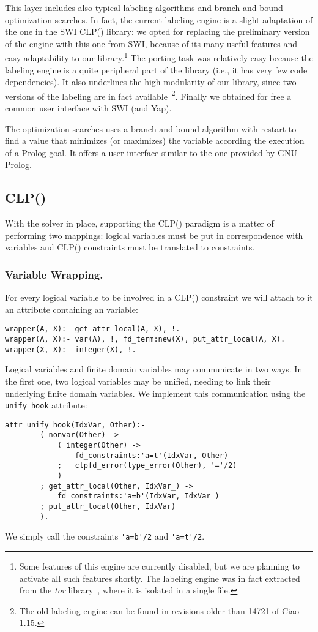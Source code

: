 \documentclass{llncs}
\newcommand{\clpfd}{CLP()\xspace}
\newcommand{\fd}{\xspace}
\begin{document}
This layer includes also typical labeling algorithms and branch and
bound optimization searches. In fact, the current labeling engine is a slight adaptation of the one
in the SWI \clpfd library: we opted for replacing the preliminary
version of the engine with this one from SWI, because of its many
useful features and easy adaptability to our library.\footnote{Some
  features of this engine are currently disabled, but we are planning
  to activate all such features shortly. The labeling engine was in
  fact extracted from the \emph{tor} library~\cite{tor2012}, where it
  is isolated in a single file.}
The porting task was relatively easy because the labeling engine is a
quite peripheral part of the library (i.e., it has very few code
dependencies).  It also underlines the high modularity of our library,
since two versions of the labeling are in fact available~\footnote{The
  old labeling engine can be found in revisions older than 14721 of
  Ciao 1.15.}.  Finally we obtained for free a common user interface
with SWI (and Yap).

The optimization searches uses a branch-and-bound algorithm with
restart to find a value that minimizes (or maximizes) the \fd
variable according the execution of a Prolog goal.  It offers a 
user-interface similar to the one provided by GNU Prolog.

\subsection{\clpfd}
With the \fd solver in place, supporting the \clpfd paradigm is a
matter of performing two mappings: logical variables must be put in 
correspondence with \fd variables and \clpfd constraints must be
translated to \fd constraints.

\subsubsection{Variable Wrapping.}

For every logical variable to be involved in a \clpfd constraint we
will attach to it an attribute containing an \fd variable:
\begin{lstlisting}
wrapper(A, X):-	get_attr_local(A, X), !.
wrapper(A, X):- var(A), !, fd_term:new(X), put_attr_local(A, X).
wrapper(X, X):- integer(X), !.
\end{lstlisting}
Logical variables and finite domain variables may communicate in two
ways. In the first one, two logical variables may be unified, needing
to link their underlying finite domain variables. We implement this
communication using the \verb!unify_hook! attribute:
\begin{lstlisting}
attr_unify_hook(IdxVar, Other):-
        ( nonvar(Other) ->
            ( integer(Other) ->
                fd_constraints:'a=t'(IdxVar, Other)
            ;   clpfd_error(type_error(Other), '='/2)
            )
        ; get_attr_local(Other, IdxVar_) ->
            fd_constraints:'a=b'(IdxVar, IdxVar_)
        ; put_attr_local(Other, IdxVar)
        ).
\end{lstlisting}
We simply call the \fd constraints \verb!'a=b'/2! and \verb!'a=t'/2!.
\end{document}
